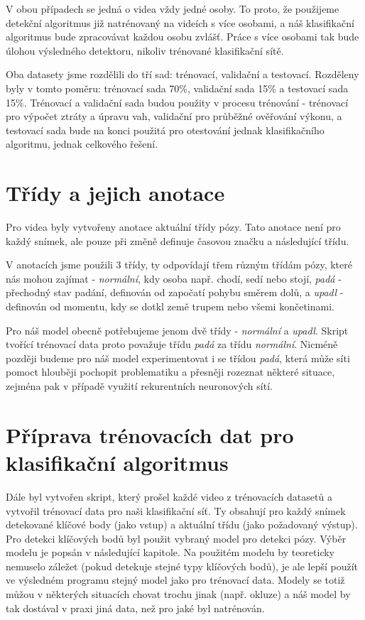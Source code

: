 V obou případech se jedná o videa vždy jedné osoby. To proto, že použijeme
detekční algoritmus již natrénovaný na videích s více osobami, a náš
klasifikační algoritmus bude zpracovávat každou osobu zvlášť. Práce s více
osobami tak bude úlohou výsledného detektoru, nikoliv trénované klasifikační
sítě.

Oba datasety jsme rozdělili do tří sad: trénovací, validační a testovací. Rozděleny byly v tomto poměru: trénovací sada 70\%, validační sada 15\% a testovací sada 15\%. Trénovací a validační sada budou použity v procesu trénování - trénovací pro výpočet ztráty a úpravu vah, validační pro průběžné ověřování výkonu, a testovací sada bude na konci použitá pro otestování jednak klasifikačního algoritmu, jednak celkového řešení.

\section{Třídy a jejich anotace}
Pro videa byly vytvořeny anotace aktuální třídy pózy. Tato anotace není pro
každý snímek, ale pouze při změně definuje časovou značku a následující třídu.

V anotacích jsme použili 3 třídy, ty odpovídají třem různým třídám pózy, které
nás mohou zajímat - \textit{normální}, kdy osoba např. chodí, sedí nebo stojí,
\textit{padá} - přechodný stav padání, definován od započatí pohybu směrem
dolů, a \textit{upadl} - definován od momentu, kdy se dotkl země trupem nebo
všemi končetinami.

Pro náš model obecně potřebujeme jenom dvě třídy - \textit{normální} a
\textit{upadl}. Skript tvořící trénovací data proto považuje třídu
\textit{padá} za třídu \textit{normální}. Nicméně později budeme pro náš model
experimentovat i se třídou \textit{padá}, která může síti pomoct hlouběji
pochopit problematiku a přesněji rozeznat některé situace, zejména pak v
případě využití rekurentních neuronových sítí.

\section{Příprava trénovacích dat pro klasifikační algoritmus}

Dále byl vytvořen skript, který prošel každé video z trénovacích datasetů a
vytvořil trénovací data pro naši klasifikační síť. Ty obsahují pro každý snímek
detekované klíčové body (jako vstup) a aktuální třídu (jako požadovaný výstup).
Pro detekci klíčových bodů byl použit vybraný model pro detekci pózy. Výběr
modelu je popsán v následující kapitole. Na použitém modelu by teoreticky
nemuselo záležet (pokud detekuje stejné typy klíčových bodů), je ale lepší
použít ve výsledném programu stejný model jako pro trénovací data. Modely se
totiž můžou v některých situacích chovat trochu jinak (např. okluze) a náš
model by tak dostával v praxi jiná data, než pro jaké byl natrénován.

